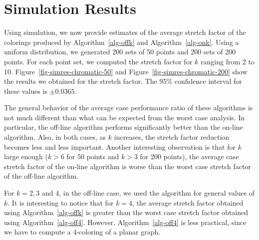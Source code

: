 \documentclass[pdftex,leqno,fleqn,12pts]{llncs}
\newcommand{\old}[1]{{}}
\begin{document}
\old{
\begin{theorem}
For any sequence $P$ of points in the plane, the $k$-coloring $c$ computed by
Algorithm~\ref{alg-onk} has the $t'(k)$-ellipse property, with 
$t'(2) \leq 3$, $t'(3) \leq 1+ \sqrt{3}$, $t'(4)  \leq 1+ \sqrt{2}$, and
$t'(k) \leq 1+ 2 \sin\frac{\pi}{k}$ for 
$k \geq 5$.
Moreover, there exist point sets such that no on-line coloring
algorithm can compute a $k$-coloring that has the $t$-ellipse property
for $t$ smaller than 
$t'(2) \geq 3$, $t'(3) \geq 1+ \sqrt{3}$, $t'(4)  \geq 1+ \sqrt{2}$, and
$t'(k) \geq 1/ \cos \frac{\pi}{k}$
for $k \geq 5$. By Theorem~\ref{thm-wspd}, it is possible to
post-process the complete $k$-partite graph induced by the
coloring computed by Algorithm 5 in order to obtain a
$((1+\epsilon)t'(k))$-spanner that has $O(|P|)$ edges.
\end{theorem}
}




\section{Simulation Results}\label{section-simres-chromatic}

Using simulation, we now provide estimates of the average stretch factor of the colorings produced by Algorithm~\ref{alg-offk} and Algorithm~\ref{alg-onk}. Using a uniform distribution, we generated 200 sets of 50 points and 200 sets of 200 points. For each point set, we computed the stretch factor for $k$ ranging from 2 to 10. Figure~\ref{fig-simres-chromatic-50} and Figure~\ref{fig-simres-chromatic-200} show the results we obtained for the stretch factor. The 95\% confidence interval for these values is $\pm 0.0365$.

The general behavior of the average case performance ratio of these algorithms is not much different than what can be expected from the worst case analysis. In particular, the off-line algorithm performs significantly better than the on-line algorithm. Also, in both cases, as $k$ increases, the stretch factor reduction becomes less and less important. Another interesting observation is that for $k$ large enough ($k>6$ for 50 points and $k>3$ for 200 points), the average case stretch factor of the on-line algorithm is worse than the worst case stretch factor of the off-line algorithm.

For $k=2,3$ and $4$, in the off-line case, we used the algorithm for general values of $k$. It is interesting to notice that for $k=4$, the average stretch factor obtained using Algorithm~\ref{alg-offk} is greater than the worst case stretch factor obtained using Algorithm~\ref{alg-off4}. However, Algorithm~\ref{alg-off4} is less practical, since we have to compute a 4-coloring of a planar graph.
\end{document}

